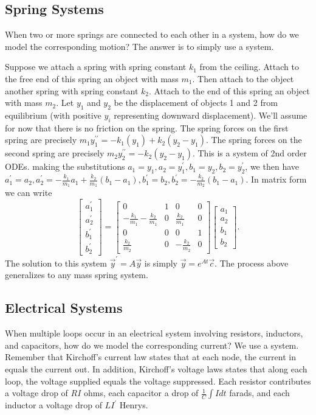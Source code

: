 \subsection{Spring Systems}
When two or more springs are connected to each other in a system, how do we model the corresponding motion?  The answer is to simply use a system.  

Suppose we attach a spring with spring constant $k_1$ from the ceiling. Attach to the free end of this spring an object with mass $m_1$.  Then attach to the object another spring with spring constant $k_2$.  Attach to the end of this spring an object with mass $m_2$. Let $y_1$ and $y_2$ be the displacement of objects 1 and 2 from equilibrium (with positive $y_i$ representing downward displacement). We'll assume for now that there is no friction on the spring. The spring forces on the first spring are precisely $m_1 y_1^{\prime\prime}= -k_1(y_1) + k_2(y_2-y_1)$.  The spring forces on the second spring are precisely $m_2 y_2^{\prime\prime} = -k_2(y_2-y_1)$.  This is a system of 2nd order ODEs.  making the substitutions $a_1 = y_1, a_2=y_1^\prime, b_1=y_2, b_2=y_2^\prime$, we then have $a_1^\prime = a_2, a_2^\prime = -\frac{k_1}{m_1}a_1 + \frac{k_2}{m_1}(b_1-a_1), b_1^\prime = b_2, b_2^\prime = -\frac{k_2}{m_2}(b_1-a_1)$.  In matrix form we can write 
$$
\begin{bmatrix}
a_1^\prime\\
a_2^\prime\\
b_1^\prime\\
b_2^\prime
\end{bmatrix}
=
\begin{bmatrix}
0&1&0&0\\
-\frac{k_1}{m_1}-\frac{k_2}{m_1}&0&\frac{k_2}{m_1}&0\\
0&0&0&1\\
\frac{k_2}{m_2}&0&-\frac{k_2}{m_2}&0
\end{bmatrix}
\begin{bmatrix}
a_1\\
a_2\\
b_1\\
b_2
\end{bmatrix}.
$$  
The solution to this system $\vec y^\prime = A\vec y$ is simply $\vec y = e^{At}\vec c$. The process above generalizes to any mass spring system.





\subsection{Electrical Systems}
When multiple loops occur in an electrical system involving resistors, inductors, and capacitors, how do we model the corresponding current?  We use a system.  Remember that Kirchoff's current law states that at each node, the current in equals the current out.  In addition, Kirchoff's voltage laws states that along each loop, the voltage supplied equals the voltage suppressed. Each resistor contributes a voltage drop of $RI$ ohms, each capacitor a drop of $\frac{1}{C}\int I dt$ farads, and each inductor a voltage drop of $LI^\prime$ Henrys.

